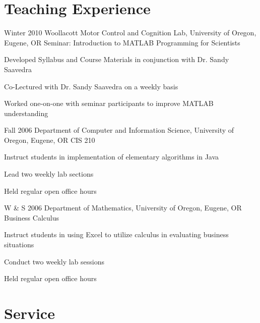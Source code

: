 \documentclass[10pt]{article} %
\begin{document}
\section{Teaching Experience}

\class
{Winter 2010}
{Woollacott Motor Control and Cognition Lab, University of Oregon, Eugene, OR}
{Seminar: Introduction to MATLAB Programming for Scientists}
{
\begin{itemize-noindent}
\item{Developed Syllabus and Course Materials in conjunction with Dr. Sandy Saavedra}
\item{Co-Lectured with Dr. Sandy Saavedra on a weekly basis}
\item{Worked one-on-one with seminar participants to improve MATLAB understanding}
\end{itemize-noindent}
}


\class
{Fall 2006}
{Department of Computer and Information Science, University of Oregon, Eugene, OR}
{CIS 210}
{
\begin{itemize-noindent}
\item{Instruct students in implementation of elementary algorithms in Java}
\item{Lead two weekly lab sections}
\item{Held regular open office hours}
\end{itemize-noindent}
}


\class
{W \& S 2006}
{Department of Mathematics, University of Oregon, Eugene, OR}
{Business Calculus}
{
\begin{itemize-noindent}
\item{Instruct students in using Excel to utilize calculus in evaluating business situations}
\item{Conduct two weekly lab sessions}
\item{Held regular open office hours}
\end{itemize-noindent}
}

\renewcommand\bibname{Publications}




\section{Service}
\end{document}
